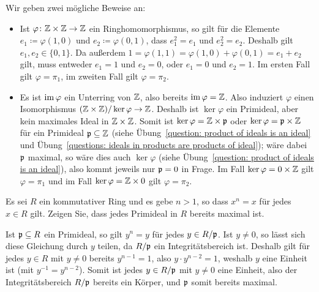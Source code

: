 \begin{solution}
  Wir geben zwei mögliche Beweise an:
  \begin{itemize}
    \item
      Ist $\varphi \colon \mathbb{Z} \times \mathbb{Z} \to \mathbb{Z}$ ein Ringhomomorphismus, so gilt für die Elemente $e_1 \coloneqq \varphi(1,0)$ und $e_2 \coloneqq \varphi(0,1)$, dass $e_1^2 = e_1$ und $e_2^2 = e_2$.
      Deshalb gilt $e_1, e_2 \in \{0,1\}$.
      Da außerdem $1 = \varphi(1,1) = \varphi(1,0) + \varphi(0,1) = e_1 + e_2$ gilt, muss entweder $e_1 = 1$ und $e_2 = 0$, oder $e_1 = 0$ und $e_2 = 1$.
      Im ersten Fall gilt $\varphi = \pi_1$, im zweiten Fall gilt $\varphi = \pi_2$.
      
    \item
      Es ist $\operatorname{im} \varphi$ ein Unterring von $\mathbb{Z}$, also bereits $\operatorname{im} \varphi = \mathbb{Z}$.
      Also induziert $\varphi$ einen Isomorphismus $(\mathbb{Z} \times \mathbb{Z})/\ker \varphi \to \mathbb{Z}$.
      Deshalb ist $\ker \varphi$ ein Primideal, aber kein maximales Ideal in $\mathbb{Z} \times \mathbb{Z}$.
      Somit ist $\ker \varphi = \mathbb{Z} \times \mathfrak{p}$ oder $\ker \varphi = \mathfrak{p} \times \mathbb{Z}$ für ein Primideal $\mathfrak{p} \subseteq \mathbb{Z}$ (siehe Übung~\ref{question: product of ideals is an ideal} und Übung~\ref{questions: ideals in products are products of ideal}); wäre dabei $\mathfrak{p}$ maximal, so wäre dies auch $\ker \varphi$ (siehe Übung~\ref{question: product of ideals is an ideal}), also kommt jeweils nur $\mathfrak{p} = 0$ in Frage.
      Im Fall $\ker \varphi = 0 \times \mathbb{Z}$ gilt $\varphi = \pi_1$ und im Fall $\ker \varphi = \mathbb{Z} \times 0$ gilt $\varphi = \pi_2$.
  \end{itemize}
\end{solution}


\begin{question}
  Es sei $R$ ein kommutativer Ring und es gebe $n > 1$, so dass $x^n = x$ für jedes $x \in R$ gilt.
  Zeigen Sie, dass jedes Primideal in $R$ bereits maximal ist.
\end{question}


\begin{solution}
  Ist $\mathfrak{p} \subseteq R$ ein Primideal, so gilt $y^n = y$ für jedes $y \in R/\mathfrak{p}$.
  Ist $y \neq 0$, so lässt sich diese Gleichung durch $y$ teilen, da $R/\mathfrak{p}$ ein Integritätsbereich ist.
  Deshalb gilt für jedes $y \in R$ mit $y \neq 0$ bereits $y^{n-1} = 1$, also $y \cdot y^{n-2} = 1$, weshalb $y$ eine Einheit ist (mit $y^{-1} = y^{n-2}$).
  Somit ist jedes $y \in R/\mathfrak{p}$ mit $y \neq 0$ eine Einheit, also der Integritätsbereich $R/\mathfrak{p}$ bereits ein Körper, und $\mathfrak{p}$ somit bereits maximal.
\end{solution}


